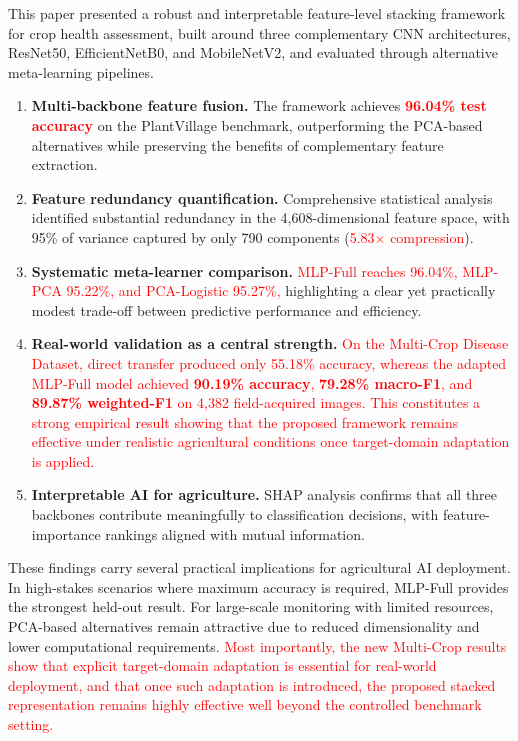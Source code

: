 \documentclass[pdflatex,sn-basic]{sn-jnl}
\begin{document}
This paper presented a robust and interpretable feature-level stacking framework for crop health assessment, built around three complementary CNN architectures, ResNet50, EfficientNetB0, and MobileNetV2, and evaluated through alternative meta-learning pipelines.

\begin{enumerate}
    \item \textbf{Multi-backbone feature fusion.} The framework achieves \textcolor{red}{\textbf{96.04\% test accuracy}} on the PlantVillage benchmark, outperforming the PCA-based alternatives while preserving the benefits of complementary feature extraction.

    \item \textbf{Feature redundancy quantification.} Comprehensive statistical analysis identified substantial redundancy in the 4,608-dimensional feature space, with 95\% of variance captured by only 790 components (\textcolor{red}{5.83$\times$ compression}).

    \item \textbf{Systematic meta-learner comparison.} \textcolor{red}{MLP-Full reaches 96.04\%, MLP-PCA 95.22\%, and PCA-Logistic 95.27\%,} highlighting a clear yet practically modest trade-off between predictive performance and efficiency.

    \item \textbf{Real-world validation as a central strength.} \textcolor{red}{On the Multi-Crop Disease Dataset, direct transfer produced only 55.18\% accuracy, whereas the adapted MLP-Full model achieved \textbf{90.19\% accuracy}, \textbf{79.28\% macro-F1}, and \textbf{89.87\% weighted-F1} on 4,382 field-acquired images. This constitutes a strong empirical result showing that the proposed framework remains effective under realistic agricultural conditions once target-domain adaptation is applied.}

    \item \textbf{Interpretable AI for agriculture.} SHAP analysis confirms that all three backbones contribute meaningfully to classification decisions, with feature-importance rankings aligned with mutual information.
\end{enumerate}

These findings carry several practical implications for agricultural AI deployment. In high-stakes scenarios where maximum accuracy is required, MLP-Full provides the strongest held-out result. For large-scale monitoring with limited resources, PCA-based alternatives remain attractive due to reduced dimensionality and lower computational requirements. \textcolor{red}{Most importantly, the new Multi-Crop results show that explicit target-domain adaptation is essential for real-world deployment, and that once such adaptation is introduced, the proposed stacked representation remains highly effective well beyond the controlled benchmark setting.}
\end{document}
